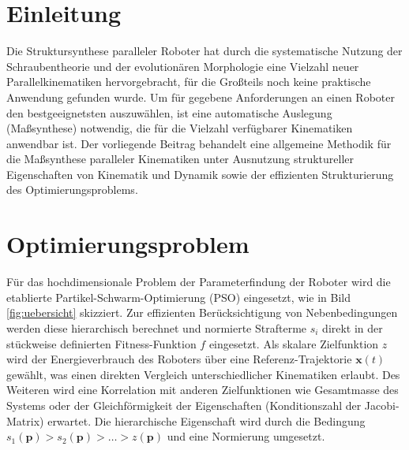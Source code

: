 \documentclass[fleqn,a4paper,10pt]{article}
\newcommand{\bm}[1]{\mathbf{#1}}
\begin{document}
\begin{multicols}{2}

\section{Einleitung}

Die Struktursynthese paralleler Roboter hat durch die systematische Nutzung der Schraubentheorie \cite{KongGos2007} und der evolutionären Morphologie \cite{Gogu2008} eine Vielzahl neuer Parallelkinematiken hervorgebracht, für die Großteils noch keine praktische Anwendung gefunden wurde.
Um für gegebene Anforderungen an einen Roboter den bestgeeignetsten auszuwählen, ist eine automatische Auslegung (Maßsynthese) notwendig, die für die Vielzahl verfügbarer Kinematiken anwendbar ist.
Der vorliegende Beitrag behandelt eine allgemeine Methodik für die Maßsynthese paralleler Kinematiken unter Ausnutzung struktureller Eigenschaften von Kinematik und Dynamik sowie der effizienten Strukturierung des Optimierungsproblems.

\section{Optimierungsproblem}

Für das hochdimensionale Problem der Parameterfindung der Roboter wird die etablierte Partikel-Schwarm-Optimierung (PSO) eingesetzt, wie in Bild\,\ref{fig:uebersicht} skizziert.
Zur effizienten Berücksichtigung von Nebenbedingungen werden diese hierarchisch berechnet und normierte Strafterme $s_i$ direkt in der stückweise definierten Fitness-Funktion $f$ eingesetzt.
Als skalare Zielfunktion $z$ wird der Energieverbrauch des Roboters über eine Referenz-Trajektorie $\bm{x}(t)$ gewählt, was einen direkten Vergleich unterschiedlicher Kinematiken erlaubt.
Des Weiteren wird eine Korrelation mit anderen Zielfunktionen wie Gesamtmasse des Systems oder der Gleichförmigkeit der Eigenschaften (Konditionszahl der Jacobi-Matrix) erwartet.
Die hierarchische Eigenschaft wird durch die Bedingung $s_1(\bm{p})>s_2(\bm{p})>\dots>z(\bm{p})$ und eine Normierung umgesetzt.


\end{multicols}
\end{document}
